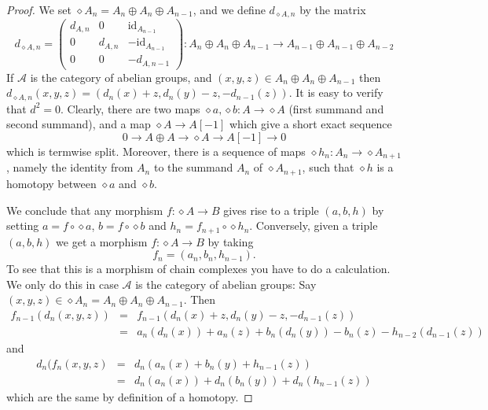 \begin{proof}
We set $\diamond A_n = A_n \oplus A_n \oplus A_{n - 1}$,
and we define $d_{\diamond A, n}$ by the matrix
$$
d_{\diamond A, n}
=
\left(
\begin{matrix}
d_{A, n} & 0 & \text{id}_{A_{n - 1}} \\
0 & d_{A, n} & -\text{id}_{A_{n - 1}} \\
0 & 0 & -d_{A, n - 1}
\end{matrix}
\right) :
A_n \oplus A_n \oplus A_{n - 1} \to
A_{n - 1} \oplus A_{n - 1} \oplus A_{n - 2}
$$
If $\mathcal{A}$ is the category of abelian groups,
and $(x, y, z) \in A_n \oplus A_n \oplus A_{n - 1}$
then $d_{\diamond A, n}(x, y, z) = (d_n(x) + z, d_n(y) - z, -d_{n - 1}(z))$.
It is easy to verify that $d^2 = 0$. Clearly,
there are two maps $\diamond a, \diamond b : A \to \diamond A$
(first summand and second summand),
and a map $\diamond A \to A[-1]$ which give
a short exact sequence
$$
0 \to
A \oplus A \to
\diamond A \to
A[-1] \to
0
$$
which is termwise split. Moreover, there is a sequence
of maps $\diamond h_n : A_n \to \diamond A_{n + 1}$, namely
the identity from $A_n$ to the summand $A_n$ of $\diamond A_{n + 1}$,
such that $\diamond h$ is a homotopy between $\diamond a$ and $\diamond b$.

\medskip\noindent
We conclude that any morphism $f : \diamond A \to B$
gives rise to a triple $(a, b, h)$ by setting $a = f \circ \diamond a$,
$b = f \circ \diamond b$ and $h_n = f_{n + 1} \circ \diamond h_n$.
Conversely, given a triple $(a, b, h)$ we get a morphism
$f : \diamond A \to B$ by taking
$$
f_n = (a_n, b_n, h_{n - 1}).
$$
To see that this is a morphism of chain complexes you have
to do a calculation. We only do this in case $\mathcal{A}$
is the category of abelian groups:
Say $(x, y, z) \in \diamond A_n = A_n \oplus A_n \oplus A_{n - 1}$.
Then
\begin{eqnarray*}
f_{n - 1}(d_n(x, y, z)) & = &
f_{n - 1}(d_n(x) + z, d_n(y) - z, -d_{n - 1}(z)) \\
& = &
a_n(d_n(x)) + a_n(z) + b_n(d_n(y)) - b_n(z) - h_{n - 2}(d_{n - 1}(z))
\end{eqnarray*}
and
\begin{eqnarray*}
d_n(f_n(x, y, z) & = &
d_n(a_n(x) + b_n(y) + h_{n - 1}(z)) \\
& = &
d_n(a_n(x)) + d_n(b_n(y)) + d_n(h_{n - 1}(z))
\end{eqnarray*}
which are the same by definition of a homotopy.
\end{proof}

